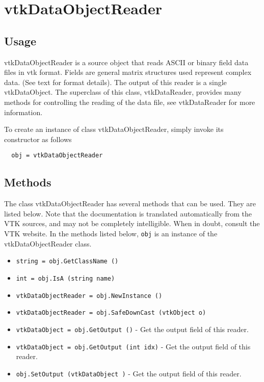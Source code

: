 \section{vtkDataObjectReader}

\subsection{Usage}

 vtkDataObjectReader is a source object that reads ASCII or binary field
 data files in vtk format. Fields are general matrix structures used
 represent complex data. (See text for format details).  The output of this
 reader is a single vtkDataObject.  The superclass of this class,
 vtkDataReader, provides many methods for controlling the reading of the
 data file, see vtkDataReader for more information.

To create an instance of class vtkDataObjectReader, simply
invoke its constructor as follows
\begin{verbatim}
  obj = vtkDataObjectReader
\end{verbatim}
\subsection{Methods}

The class vtkDataObjectReader has several methods that can be used.
  They are listed below.
Note that the documentation is translated automatically from the VTK sources,
and may not be completely intelligible.  When in doubt, consult the VTK website.
In the methods listed below, \verb|obj| is an instance of the vtkDataObjectReader class.
\begin{itemize}
\item  \verb|string = obj.GetClassName ()|

\item  \verb|int = obj.IsA (string name)|

\item  \verb|vtkDataObjectReader = obj.NewInstance ()|

\item  \verb|vtkDataObjectReader = obj.SafeDownCast (vtkObject o)|

\item  \verb|vtkDataObject = obj.GetOutput ()| -  Get the output field of this reader.

\item  \verb|vtkDataObject = obj.GetOutput (int idx)| -  Get the output field of this reader.

\item  \verb|obj.SetOutput (vtkDataObject )| -  Get the output field of this reader.

\end{itemize}
